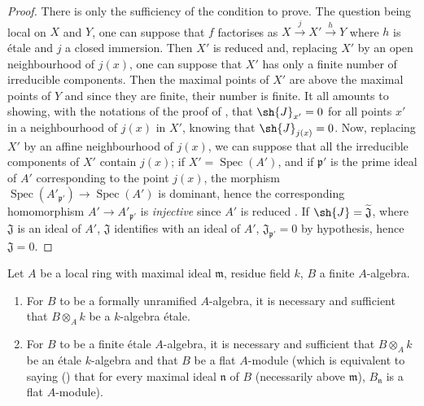 \begin{proof}
There is only the sufficiency of the condition to prove.
The question being local on $X$ and $Y$, one can suppose  that $f$ factorises as $X\xrightarrow{j}X'\xrightarrow{h}Y$ where $h$ is \'etale and $j$ a closed immersion.
Then $X'$ is reduced  and, replacing $X'$ by an open neighbourhood of $j(x)$, one can suppose that $X'$ has only a finite number of irreducible components.
Then the maximal points of $X'$ are above the maximal points of $Y$  and since they are finite, their number is finite.
It all amounts to showing, with the notations of the proof of , that $\sh{J}_{x'}=0$ for all points $x'$ in a neighbourhood of $j(x)$ in $X'$, knowing that $\sh{J}_{j(x)}=0$.
Now, replacing $X'$ by an affine neighbourhood of $j(x)$, we can suppose that all the irreducible components of $X'$ contain $j(x)$;
if $X'=\operatorname{Spec}(A')$, and if $\mathfrak{p}'$ is the prime ideal of $A'$ corresponding to the point $j(x)$, the morphism $\operatorname{Spec}(A'_{\mathfrak{p}'})\to\operatorname{Spec}(A')$ is dominant, hence the corresponding homomorphism $A'\to A'_{\mathfrak{p}'}$ is \emph{injective} since $A'$ is reduced .
If $\sh{J}=\widetilde{\mathfrak{J}}$, where $\mathfrak{J}$ is an ideal of $A'$, $\mathfrak{J}$ identifies with an ideal of $A'$, $\mathfrak{J}_{\mathfrak{p}'}=0$ by hypothesis, hence $\mathfrak{J}=0$.
\end{proof}

\begin{corollary}[18.4.14]
\label{IV.18.4.14}
Let $A$ be a local ring with maximal ideal $\mathfrak{m}$, residue field $k$, $B$ a finite $A$-algebra.
\begin{enumerate}
  \item[(i)] For $B$ to be a formally unramified $A$-algebra, it is necessary and sufficient that $B\otimes_A k$ be a $k$-algebra \'etale.
  \item[(ii)] For $B$ to be a finite \'etale $A$-algebra, it is necessary and sufficient that $B\otimes_A k$ be an \'etale $k$-algebra and that $B$ be a flat $A$-module (which is equivalent to saying () that for every maximal ideal $\mathfrak{n}$ of $B$ (necessarily above $\mathfrak{m}$), $B_\mathfrak{n}$ is a flat $A$-module).
\end{enumerate}
\end{corollary}

